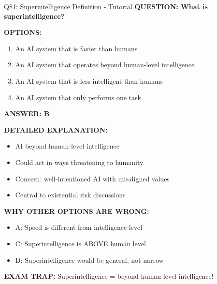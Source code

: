 \documentclass[8pt]{beamer}
\begin{document}
	\begin{frame}{Q81: Superintelligence Definition - Tutorial}
		\fontsize{6.5}{7.5}\selectfont
		\textbf{QUESTION: What is superintelligence?}
		
		\vspace{0.1cm}
		\textbf{OPTIONS:}
		\begin{enumerate}
			\item An AI system that is faster than humans
			\item An AI system that operates beyond human-level intelligence
			\item An AI system that is less intelligent than humans
			\item An AI system that only performs one task
		\end{enumerate}
		
		\vspace{0.1cm}
		\textcolor{myblue}{\textbf{ANSWER: B}}
		
		\vspace{0.1cm}
		\textbf{DETAILED EXPLANATION:}
		\begin{itemize}
			\item AI beyond human-level intelligence
			\item Could act in ways threatening to humanity
			\item Concern: well-intentioned AI with misaligned values
			\item Central to existential risk discussions
		\end{itemize}
		
		\vspace{0.1cm}
		\textcolor{myred}{\textbf{WHY OTHER OPTIONS ARE WRONG:}}
		\begin{itemize}
			\item \textcolor{myred}{A:} Speed is different from intelligence level
			\item \textcolor{myred}{C:} Superintelligence is ABOVE human level
			\item \textcolor{myred}{D:} Superintelligence would be general, not narrow
		\end{itemize}
		
		\textcolor{myred}{\textbf{EXAM TRAP:}} Superintelligence = \textcolor{myblue}{beyond human-level intelligence}!
	\end{frame}
	
\end{document}
